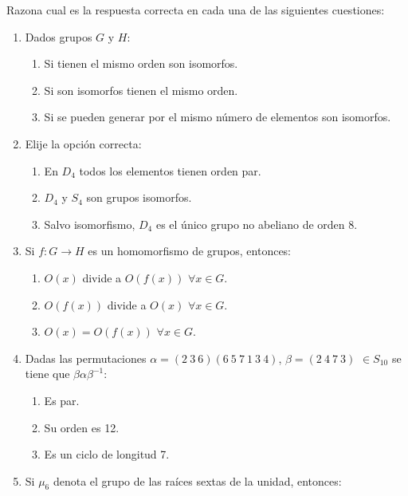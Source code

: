 \documentclass[12pt]{article}
\begin{document}
    \begin{ejercicio}
        Razona cual es la respuesta correcta en cada una de las siguientes cuestiones:
        \begin{enumerate}
            \item Dados grupos $G$ y $H$:
            \begin{enumerate}
                \item Si tienen el mismo orden son isomorfos.
                \item Si son isomorfos tienen el mismo orden.
                \item Si se pueden generar por el mismo número de elementos son isomorfos.
            \end{enumerate}
            \item Elije la opción correcta:
            \begin{enumerate}
                \item En $D_4$ todos los elementos tienen orden par.
                \item $D_4$ y $S_4$ son grupos isomorfos.
                \item Salvo isomorfismo, $D_4$ es el único grupo no abeliano de orden 8.
            \end{enumerate}
            \item Si $f : G \to H$ es un homomorfismo de grupos, entonces:
            \begin{enumerate}
                \item $O(x)$ divide a $O(f(x))$ $\forall x \in G$.
                \item $O(f(x))$ divide a $O(x)$ $\forall x \in G$.
                \item $O(x) = O(f(x))$ $\forall x \in G$.
            \end{enumerate}
            \item Dadas las permutaciones $\alpha = (2\ 3\ 6)(6\ 5\ 7\ 1\ 3\ 4)$, $\beta = (2\ 4\ 7\ 3)$ $\in S_{10}$ se tiene que $\beta\alpha\beta^{-1}$:
            \begin{enumerate}
                \item Es par.
                \item Su orden es 12.
                \item Es un ciclo de longitud 7.
            \end{enumerate}
            \item Si $\mu_6$ denota el grupo de las raíces sextas de la unidad, entonces:
            \begin{enumerate}

\end{enumerate}
\end{enumerate}
\end{ejercicio}
\end{document}
